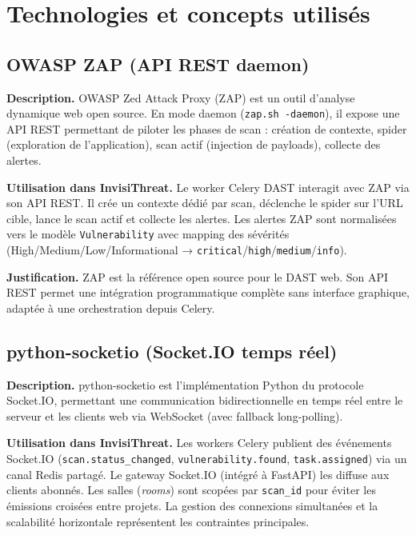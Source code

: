 \section{Technologies et concepts utilisés}

\subsection{OWASP ZAP (API REST daemon)}

\textbf{Description.} OWASP Zed Attack Proxy (ZAP) est un outil d'analyse dynamique web open source. En mode daemon (\texttt{zap.sh -daemon}), il expose une API REST permettant de piloter les phases de scan : création de contexte, spider (exploration de l'application), scan actif (injection de payloads), collecte des alertes.

\textbf{Utilisation dans InvisiThreat.} Le worker Celery DAST interagit avec ZAP via son API REST. Il crée un contexte dédié par scan, déclenche le spider sur l'URL cible, lance le scan actif et collecte les alertes. Les alertes ZAP sont normalisées vers le modèle \texttt{Vulnerability} avec mapping des sévérités (High/Medium/Low/Informational → \texttt{critical}/\texttt{high}/\texttt{medium}/\texttt{info}).

\textbf{Justification.} ZAP est la référence open source pour le DAST web. Son API REST permet une intégration programmatique complète sans interface graphique, adaptée à une orchestration depuis Celery.

\subsection{python-socketio (Socket.IO temps réel)}

\textbf{Description.} python-socketio est l'implémentation Python du protocole Socket.IO, permettant une communication bidirectionnelle en temps réel entre le serveur et les clients web via WebSocket (avec fallback long-polling).

\textbf{Utilisation dans InvisiThreat.} Les workers Celery publient des événements Socket.IO (\texttt{scan.status\_changed}, \texttt{vulnerability.found}, \texttt{task.assigned}) via un canal Redis partagé. Le gateway Socket.IO (intégré à FastAPI) les diffuse aux clients abonnés. Les salles (\textit{rooms}) sont scopées par \texttt{scan\_id} pour éviter les émissions croisées entre projets. La gestion des connexions simultanées et la scalabilité horizontale représentent les contraintes principales.

